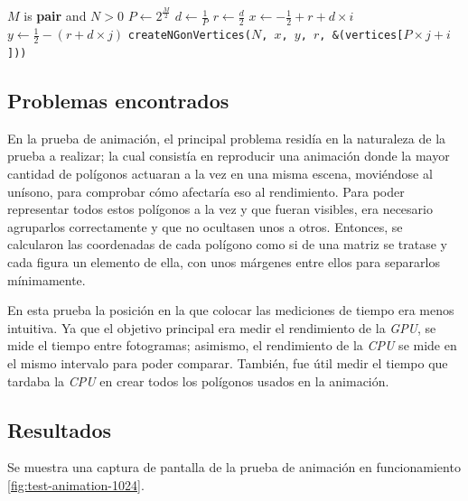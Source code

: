 \begin{algorithm}
\caption{Algoritmo de creación de polígonos en matriz cuadrada}\label{alg:polygon-matrix}
\begin{algorithmic}

\Require $M$ is \textbf{pair} and $N >0$ 
\State $P \gets 2^{\frac{M}{2}}$ 
\State $d \gets \frac{1}{P}$ 
\State $r \gets \frac{d}{2}$
        \State $x \gets -\frac{1}{2} + r + d \times i$
        \State $y \gets \frac{1}{2} - (r + d \times j)$
        \newline
        \texttt{createNGonVertices($N$, $x$, $y$, $r$, \&(vertices[$P \times j + i$]))}
    \EndWhile
\EndWhile

\end{algorithmic}
\end{algorithm}

\subsection{Problemas encontrados}
En la prueba de animación, el principal problema residía en la naturaleza de la prueba a realizar; la cual consistía en reproducir una animación donde la mayor cantidad de polígonos actuaran a la vez en una misma escena, moviéndose al unísono, para comprobar cómo afectaría eso al rendimiento. Para poder representar todos estos polígonos a la vez y que fueran visibles, era necesario agruparlos correctamente y que no ocultasen unos a otros. Entonces, se calcularon las coordenadas de cada polígono como si de una matriz se tratase y cada figura un elemento de ella, con unos márgenes entre ellos para separarlos mínimamente. 

En esta prueba la posición en la que colocar las mediciones de tiempo era menos intuitiva. Ya que el objetivo principal era medir el rendimiento de la \textit{GPU}, se mide el tiempo entre fotogramas; asimismo, el rendimiento de la \textit{CPU} se mide en el mismo intervalo para poder comparar. También, fue útil medir el tiempo que tardaba la \textit{CPU} en crear todos los polígonos usados en la animación.

\subsection{Resultados}

Se muestra una captura de pantalla de la prueba de animación en funcionamiento \ref{fig:test-animation-1024}.

